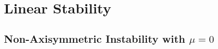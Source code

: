 \documentclass[openacc]{rstransa}%
\newcommand{\Reyn}{\mathrm{Re}}
\begin{document}
\section{Linear Stability}
\label{sec:linear}
\subsection{Non-Axisymmetric Instability with $\mu = 0$}
%
%
%
\end{document}
